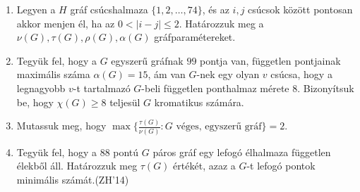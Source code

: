 \documentclass[a4paper, 12pt]{article}
\begin{document}
\begin{enumerate}
\item Legyen a $H$ gráf csúcshalmaza $\{1,2,\ldots,74\}$, és az $i,j$ csúcsok között pontosan akkor menjen él, ha az $0<|i-j|\le 2$. Határozzuk meg a $\nu(G), \tau(G),\rho(G),\alpha(G)$ gráfparamétereket.%


\item Tegyük fel, hogy a $G$ egyszerű gráfnak $99$ pontja van, független pontjainak maximális száma $\alpha(G)=15$, ám van $G$-nek egy olyan $v$ csúcsa, hogy a legnagyobb $v$-t tartalmazó $G$-beli független ponthalmaz mérete $8$. Bizonyítsuk be, hogy $\chi(G)\ge 8$ teljesül $G$ kromatikus számára.


\item Mutassuk meg, hogy $\max\{\frac{\tau(G)}{\nu(G)}:G\mbox{ véges, egyszerű gráf}\}=2$.



\item Tegyük fel, hogy a $88$ pontú $G$ páros gráf egy lefogó élhalmaza független élekből áll. Határozzuk meg $\tau(G)$ értékét, azaz a $G$-t lefogó pontok minimális számát.\hspace*{0em}\hfill(ZH'14)

\end{enumerate}
\end{document}
